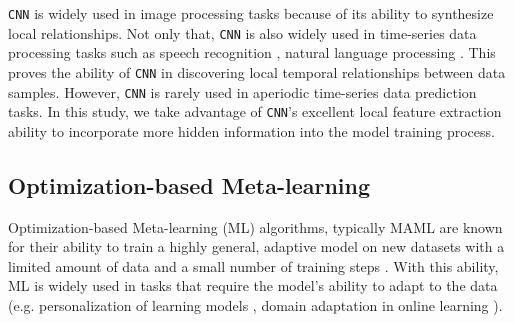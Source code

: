 \documentclass[aps,prb,groupedaddress,twocolumn,showpacs,dvipdfmx,superscriptaddress,pdftex]{revtex4-2}
\begin{document}
\verb|CNN| is widely used in image processing tasks \citep{naranjo2020review, sharma2018analysis} because of its ability to synthesize local relationships. Not only that, \verb|CNN| is also widely used in time-series data processing tasks such as speech recognition \cite{dua2022developing}, natural language processing \cite{varshitha2023natural}. This proves the ability of \verb|CNN| in discovering local temporal relationships between data samples. However, \verb|CNN| is rarely used in aperiodic time-series data prediction tasks. In this study, we take advantage of \verb|CNN|'s excellent local feature extraction ability to incorporate more hidden information into the model training process.

\subsection{Optimization-based Meta-learning}


Optimization-based Meta-learning (ML) algorithms, typically MAML \cite{finn2017model} are known for their ability to train a highly general, adaptive model on new datasets with a limited amount of data and a small number of training steps \citep{hospedales2021meta, vettoruzzo2024advances}. With this ability, ML is widely used in tasks that require the model's ability to adapt to the data (e.g. personalization of learning models \citep{chen2018federated, fallah2020personalized,nguyen2022meta}, domain adaptation in online learning \citep{hu2023meta, khoee2024domain}).

\vspace{2mm}

\end{document}
